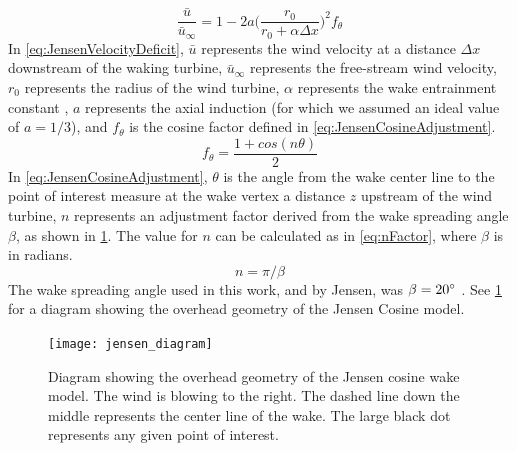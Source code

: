 \documentclass{jpconf}
\begin{document}
\begin{equation}
\frac{ \bar{u}}{\bar{u}_\infty} = 1 - 2a \bigg(\frac{r_0}{r_0 + \alpha \Delta x} \bigg)^2 f_\theta 
\label{eq:JensenVelocityDeficit}
\end{equation}
%
In \cref{eq:JensenVelocityDeficit}, $\bar{u}$ represents the wind velocity at a distance $\Delta x$ downstream of the waking turbine, $\bar{u}_\infty$ represents the free-stream wind velocity, $r_0$ represents the radius of the wind turbine, $\alpha$ represents the wake entrainment constant \cite{jensen1983}, $a$ represents the axial induction (for which we assumed an ideal value of $a = 1/3$), and $f_\theta$ is the cosine factor defined in \cref{eq:JensenCosineAdjustment}.
%
\begin{equation}
f_\theta = \frac{1 + cos(n\theta)}{2}
\label{eq:JensenCosineAdjustment}
\end{equation}
%
In \cref{eq:JensenCosineAdjustment},  $\theta$ is the angle from the wake center line to the point of interest measure at the wake vertex a distance $z$ upstream of the wind turbine, $n$ represents an adjustment factor derived from the wake spreading angle $\beta$, as shown in \cref{fig:JensenDiagrams}. The value for $n$ can be calculated as in \cref{eq:nFactor}, where $\beta$ is in radians.
%
\begin{equation}
n = \pi / \beta
\label{eq:nFactor}
\end{equation}
%
The wake spreading angle used in this work, and by Jensen, was $\beta = 20 \degree$  \cite{jensen1983}. See \cref{fig:JensenDiagrams} for a diagram showing the overhead geometry of the Jensen Cosine model.
%
\begin{figure}[h!]
	\centering
	\texttt{[image: jensen\_diagram]}
	\caption{Diagram showing the overhead geometry of the Jensen cosine wake model. The wind is blowing to the right. The dashed line down the middle represents the center line of the wake. The large black dot represents any given point of interest.}
	\label{fig:JensenDiagrams}
\end{figure}
\end{document}
